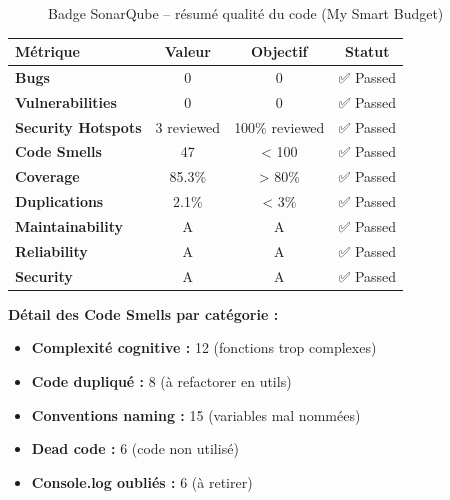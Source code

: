 \begin{tcolorbox}[colback=green!5!white,colframe=green!60!black,title=\textbf{Dashboard SonarQube - My Smart Budget (15 février 2026)}]
\begin{center}
\begin{figure}[H]
    \centering
    \caption{Badge SonarQube -- résumé qualité du code (My Smart Budget)}
    \label{fig:sonarqube-badge}
\end{figure}
\end{center}

\begin{center}
\begin{tabular}{|l|c|c|c|}
\hline
\textbf{Métrique} & \textbf{Valeur} & \textbf{Objectif} & \textbf{Statut} \\
\hline
\textbf{Bugs} & 0 & 0 & ✅ Passed \\
\textbf{Vulnerabilities} & 0 & 0 & ✅ Passed \\
\textbf{Security Hotspots} & 3 reviewed & 100\% reviewed & ✅ Passed \\
\textbf{Code Smells} & 47 & < 100 & ✅ Passed \\
\textbf{Coverage} & 85.3\% & > 80\% & ✅ Passed \\
\textbf{Duplications} & 2.1\% & < 3\% & ✅ Passed \\
\textbf{Maintainability} & A & A & ✅ Passed \\
\textbf{Reliability} & A & A & ✅ Passed \\
\textbf{Security} & A & A & ✅ Passed \\
\hline
\end{tabular}
\end{center}

\textbf{Détail des Code Smells par catégorie :}
\begin{itemize}
    \item \textbf{Complexité cognitive :} 12 (fonctions trop complexes)
    \item \textbf{Code dupliqué :} 8 (à refactorer en utils)
    \item \textbf{Conventions naming :} 15 (variables mal nommées)
    \item \textbf{Dead code :} 6 (code non utilisé)
    \item \textbf{Console.log oubliés :} 6 (à retirer)
\end{itemize}
\end{tcolorbox}

